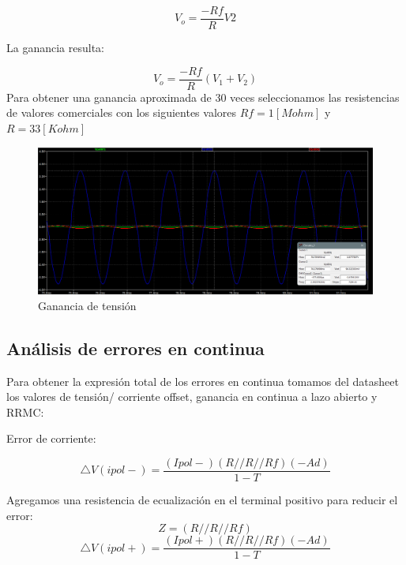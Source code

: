 \documentclass[12pt]{article}
\begin{document}
	\begin{equation}
		V_{o}=\frac{-Rf}{R}V2
	\end{equation}
	
	La ganancia resulta:
	
	\begin{equation}
		V_{o}=\frac{-Rf}{R}(V_{1}+V_{2})
	\end{equation}
	Para obtener una ganancia aproximada de 30 veces seleccionamos las resistencias de valores comerciales con los siguientes valores $Rf=1[Mohm]$ y $R=33[Kohm]$
	
	\begin{figure}[h]
		\includegraphics[width=\linewidth]{Imagenes_simulaciones/Sim_V1_0.1__V2_0.02}
		\caption[Ganancia de tensión]{Ganancia de tensión}
		\label{fig:simv10}
	\end{figure}
	
	\subsection{Análisis de errores en continua}
	Para obtener la expresión total de los errores en continua tomamos del datasheet los valores de tensión/ corriente offset, ganancia en continua a lazo abierto y RRMC:
	
	Error de corriente:
	
	\begin{equation}
		\bigtriangleup V(ipol-) =\frac{(Ipol-)(R//R//Rf)(-Ad)}{1-T}
	\end{equation}
	
	Agregamos una resistencia de ecualización en el terminal positivo para reducir el error:
	\begin{equation}
		Z=(R//R//Rf)
	\end{equation}
	\begin{equation}
			\bigtriangleup V(ipol+) =\frac{(Ipol+)(R//R//Rf)(-Ad)}{1-T}
	\end{equation}
\end{document}
